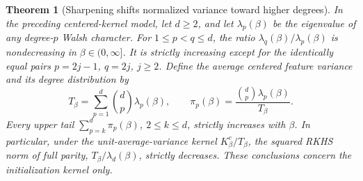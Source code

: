 \documentclass[11pt]{article}
\newtheorem{theorem}{Theorem}\newtheorem{lemma}[theorem]{Lemma}
\begin{document}
\begin{theorem}[Sharpening shifts normalized variance toward higher degrees]
\label{thm:degree-order}
In the preceding centered-kernel model, let $d\ge2$, and let
$\lambda_p(\beta)$ be the eigenvalue of any degree-$p$ Walsh character.
For $1\le p<q\le d$, the ratio
$\lambda_q(\beta)/\lambda_p(\beta)$ is nondecreasing in
$\beta\in(0,\infty]$. It is strictly increasing except for the
identically equal pairs $p=2j-1$, $q=2j$, $j\ge2$.
Define the average centered feature variance and its degree distribution by
\[
 T_\beta=\sum_{p=1}^d\binom dp\lambda_p(\beta),\qquad
 \pi_p(\beta)=\frac{\binom dp\lambda_p(\beta)}{T_\beta}.
                                                               \tag{K1}
\]
Every upper tail $\sum_{p=k}^d\pi_p(\beta)$, $2\le k\le d$,
strictly increases with $\beta$. In particular, under the
unit-average-variance kernel $K_\beta^c/T_\beta$, the squared RKHS
norm of full parity, $T_\beta/\lambda_d(\beta)$, strictly decreases.
These conclusions concern the initialization kernel only.
\end{theorem}
\end{document}
